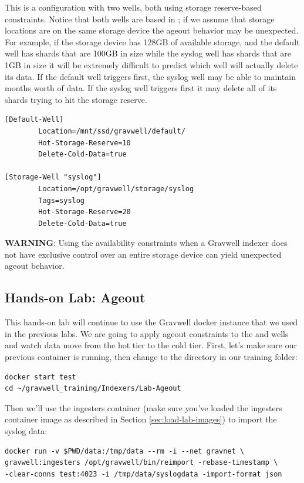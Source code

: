 {{This is a configuration with two wells, both using storage
reserve-based constraints. Notice that both wells are based in
; if we assume that storage locations are on
the same storage device the ageout behavior may be unexpected. For
example, if the storage device has 128GB of available storage, and the
default well has shards that are 100GB in size while the syslog well has
shards that are 1GB in size it will be extremely difficult to predict
which well will actually delete its data. If the default well
triggers first, the syslog well may be able to maintain months worth
of data. If the syslog well triggers first it may delete all of its
shards trying to hit the storage reserve.

\begin{Verbatim}[breaklines=true]
[Default-Well]
        Location=/mnt/ssd/gravwell/default/
        Hot-Storage-Reserve=10
        Delete-Cold-Data=true

[Storage-Well "syslog"]
        Location=/opt/gravwell/storage/syslog
        Tags=syslog
        Hot-Storage-Reserve=20
        Delete-Cold-Data=true
\end{Verbatim}

\textbf{WARNING}: Using the availability constraints when a Gravwell indexer
does not have exclusive control over an entire storage device can yield
unexpected ageout behavior.

\subsection{Hands-on Lab: Ageout}

This hands-on lab will continue to use the Gravwell docker instance
that we used in the previous labs. We are going to apply ageout
constraints to the  and  wells and watch data move
from the hot tier to the cold tier. First, let's make sure our previous
container is running, then change to the  directory in
our training folder:

\begin{Verbatim}[breaklines=true]
docker start test
cd ~/gravwell_training/Indexers/Lab-Ageout
\end{Verbatim}

Then we'll use the ingesters container (make sure you've loaded the ingesters container image as described in Section \ref{sec:load-lab-images}) to import the syslog data:
\begin{samepage}
\begin{Verbatim}[breaklines=true]
docker run -v $PWD/data:/tmp/data --rm -i --net gravnet \
gravwell:ingesters /opt/gravwell/bin/reimport -rebase-timestamp \
-clear-conns test:4023 -i /tmp/data/syslogdata -import-format json
\end{Verbatim}
\end{samepage}

}}
